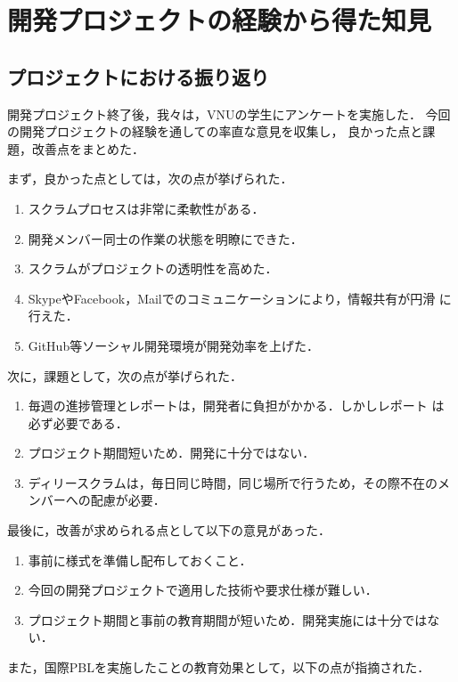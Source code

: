 \documentclass[a4j, 12Q, twocolumn, twoside]{jsarticle}
\begin{document}
\section{開発プロジェクトの経験から得た知見}\label{sec:lessonslearned}
\subsection{プロジェクトにおける振り返り}
開発プロジェクト終了後，我々は，VNUの学生にアンケートを実施した．
今回の開発プロジェクトの経験を通しての率直な意見を収集し，
良かった点と課題，改善点をまとめた．

まず，良かった点としては，次の点が挙げられた．

\begin{enumerate}
 \item スクラムプロセスは非常に柔軟性がある．
 \item 開発メンバー同士の作業の状態を明瞭にできた．
 \item スクラムがプロジェクトの透明性を高めた．
 \item SkypeやFacebook，Mailでのコミュニケーションにより，情報共有が円滑
       に行えた．
 \item GitHub等ソーシャル開発環境が開発効率を上げた．
\end{enumerate}

次に，課題として，次の点が挙げられた．

\begin{enumerate}
 \item 毎週の進捗管理とレポートは，開発者に負担がかかる．しかしレポート
       は必ず必要である．
 \item プロジェクト期間短いため．開発に十分ではない．
 \item ディリースクラムは，毎日同じ時間，同じ場所で行うため，その際不在のメンバーへの配慮が必要．
\end{enumerate}

最後に，改善が求められる点として以下の意見があった．

\begin{enumerate}
 \item 事前に様式を準備し配布しておくこと．
 \item 今回の開発プロジェクトで適用した技術や要求仕様が難しい．
 \item プロジェクト期間と事前の教育期間が短いため．開発実施には十分ではない．
\end{enumerate}

また，国際PBLを実施したことの教育効果として，以下の点が指摘された．
\end{document}
